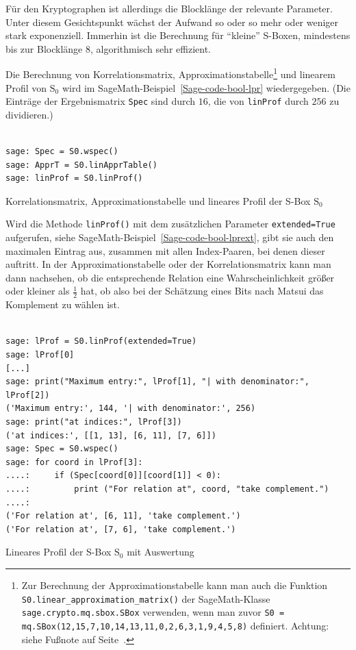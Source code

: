 \begin{refsegment}
Für den Kryptographen ist allerdings die Blocklänge der relevante
Parameter. Unter diesem Gesichtspunkt wächst der Aufwand so oder
so mehr oder weniger stark exponenziell. Immerhin ist die
Berechnung für "`kleine"' S-Boxen, mindestens bis zur Blocklänge $8$,
algorithmisch sehr effizient.

Die Berechnung von Korrelationsmatrix,
Approximationstabelle\footnote{%
  Zur Berechnung der Approximationstabelle kann man auch die Funktion
  {\tt S0.linear\_approximation\_matrix()}
  der SageMath-Klasse {\tt sage.crypto.mq.sbox.SBox} verwenden, wenn man
  zuvor {\tt S0 = mq.SBox(12,15,7,10,14,13,11,0,2,6,3,1,9,4,5,8)}
  definiert. Achtung: siehe Fußnote auf Seite~\pageref{fn-lin-appr}.
} und linearem Profil
von $\mathrm{S}_0$ wird im
SageMath-Beispiel~\ref{Sage-code-bool-lpr} wiedergegeben. (Die Einträge der
Ergebnismatrix \verb:Spec: sind durch $16$, die von \verb:linProf:
durch $256$ zu dividieren.)

\begin{sagecode}
\begin{verbatim}

sage: Spec = S0.wspec()
sage: ApprT = S0.linApprTable()
sage: linProf = S0.linProf()
\end{verbatim}
\caption{Korrelationsmatrix,
   Approximationstabelle und lineares
   Profil
   der S-Box $\mathrm{S}_0$}\label{Sage-code-bool-lpr}
\end{sagecode}

Wird die Methode {\tt linProf()} mit dem zusätzlichen Parameter
{\tt extended=True} aufgerufen, siehe SageMath-Beispiel~\ref{Sage-code-bool-lprext},
gibt sie auch den maximalen Eintrag aus,
zusammen mit allen Index-Paaren, bei denen dieser auftritt. In der
Approximationstabelle oder der
Korrelationsmatrix kann man dann nachsehen,
ob die entsprechende
Relation eine Wahrscheinlichkeit größer oder kleiner als $\frac{1}{2}$
hat, ob also bei der Schätzung eines Bits nach Matsui das Komplement
zu wählen ist.

\begin{sagecode}
\begin{verbatim}

sage: lProf = S0.linProf(extended=True)
sage: lProf[0]
[...]
sage: print("Maximum entry:", lProf[1], "| with denominator:", lProf[2])
('Maximum entry:', 144, '| with denominator:', 256)
sage: print("at indices:", lProf[3])
('at indices:', [[1, 13], [6, 11], [7, 6]])
sage: Spec = S0.wspec()
sage: for coord in lProf[3]:
....:     if (Spec[coord[0]][coord[1]] < 0):
....:         print ("For relation at", coord, "take complement.")
....:
('For relation at', [6, 11], 'take complement.')
('For relation at', [7, 6], 'take complement.')
\end{verbatim}
\caption{Lineares Profil
   der S-Box $\mathrm{S}_0$ mit Auswertung}\label{Sage-code-bool-lprext}
\end{sagecode}


\end{refsegment}
